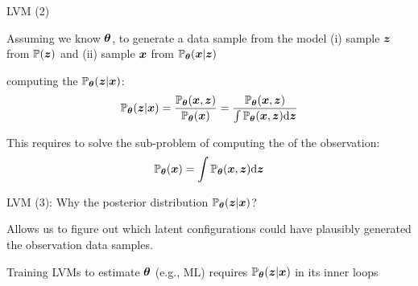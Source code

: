 \documentclass[handout,fleqn,aspectratio=169]{beamer}
\begin{document}
\begin{frame}{LVM (2)}

\plitemsep 0.1in

\bci 

\item Assuming we know $\bm{\theta}$, to generate a data sample from the model (i) sample $\bm{z}$ from $\mathbb{P}( \bm{z} )$ and (ii) sample $\bm{x}$ from $\mathbb{P}_{\bm{\theta}}( \bm{x}|\bm{z} )$ 

\item {} computing the  $\mathbb{P}_{\bm{\theta}}( \bm{z} | \bm{x} )$:
$$
\mathbb{P}_{\bm{\theta}}( \bm{z} | \bm{x} ) = \frac{\mathbb{P}_{\bm{\theta}}( \bm{x},\bm{z} )}{\mathbb{P}_{\bm{\theta}}( \bm{x} )} = 
\frac{\mathbb{P}_{\bm{\theta}}( \bm{x},\bm{z} )}{\int \mathbb{P}_{\bm{\theta}}( \bm{x},\bm{z} ) \text{d}\bm{z}}
$$

\item This requires to solve the sub-problem of computing the  of the observation:
$$\displaystyle \mathbb{P}_{\bm{\theta}}( \bm{x} ) = \int \mathbb{P}_{\bm{\theta}}( \bm{x},\bm{z} ) \text{d}\bm{z}$$

\eci
\end{frame}

\begin{frame}{LVM (3): Why the posterior distribution $\mathbb{P}_{\bm{\theta}}( \bm{z} | \bm{x} )$?}

\plitemsep 0.2in

\bci 

\item {} Allows us to figure out which latent configurations could have plausibly generated the observation data samples.

\item {} Training LVMs to estimate $\bm{\theta}$ (e.g., ML) requires $\mathbb{P}_{\bm{\theta}}( \bm{z} | \bm{x} )$ in its inner loops

\item[]
\eci
\end{frame}
\end{document}
